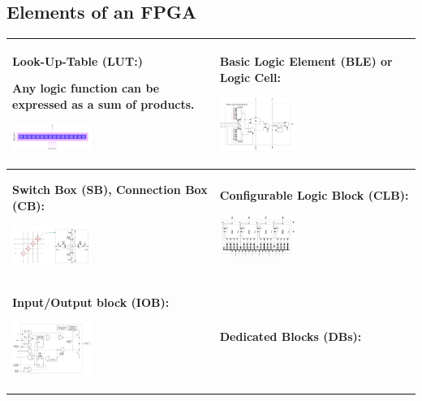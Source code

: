 	\subsection{Elements of an FPGA }
		\begin{longtable}{|p{}|p{}|}
			\hline
			\textbf{Look-Up-Table (LUT:)}
			
			Any logic function can be expressed as a sum of products.
				
				\includegraphics[width=0.4\textwidth]{./pictures/LUT.png}
				& \textbf{Basic Logic Element (BLE) or Logic Cell:}
				
					\includegraphics[width=0.4\textwidth]{./pictures/ble.png}\\
			\hline
			\textbf{Switch Box (SB), Connection Box (CB):}
			
				\includegraphics[width=0.4\textwidth]{./pictures/sb.png}
				& \textbf{Configurable Logic Block (CLB):}
				
				\includegraphics[width=0.4\textwidth]{./pictures/clb.png} \\
			\hline		
			\textbf{Input/Output block (IOB):}
			
				\includegraphics[width=0.4\textwidth]{./pictures/iob.png}
				& \textbf{Dedicated Blocks (DBs):}
				

\end{longtable}
